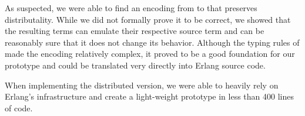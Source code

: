 As suspected, we were able to find an encoding
from \corejoincalc to \actorpicalc
that preserves distributality.
While we did not formally prove it to be correct,
we showed that the resulting terms can emulate their respective source term
and can be reasonably sure that it does not change its behavior.
Although the typing rules of \actorpicalc made the encoding relatively complex,
it proved to be a good foundation for our prototype
and could be translated very directly into Erlang source code.

When implementing the distributed version,
we were able to heavily rely on Erlang's infrastructure
and create a light-weight prototype in less than 400 lines of code.

